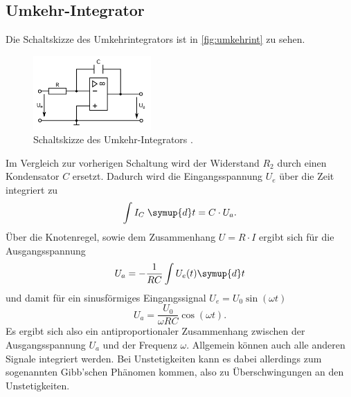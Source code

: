 \subsection{Umkehr-Integrator}
Die Schaltskizze des Umkehrintegrators ist in \autoref{fig:umkehrint} zu sehen.
\begin{figure}[H]
    \centering
    \includegraphics[width=0.4\textwidth]{integrator.png}
    \caption{Schaltskizze des Umkehr-Integrators \cite{anleitung}.}
    \label{fig:umkehrint}
\end{figure}
Im Vergleich zur vorherigen Schaltung wird der Widerstand $R_2$ durch einen Kondensator $C$
ersetzt.
Dadurch wird die Eingangsspannung $U_e$ über die Zeit integriert zu
\begin{equation*}
    \int I_C \; \symup{d} t = C \cdot U_a.
\end{equation*}
Über die Knotenregel, sowie dem Zusammenhang $U = R \cdot I$ ergibt sich für die Ausgangsspannung
\begin{equation*}
    U_a = - \frac{1}{RC} \int U_e (t) \symup{d} t
\end{equation*}
und damit für ein sinusförmiges Eingangssignal $U_e = U_0 \sin(\omega t)$
\begin{equation*}
    U_a = \frac{U_0}{\omega R C} \cos(\omega t).
\end{equation*}
Es ergibt sich also ein antiproportionaler Zusammenhang zwischen der Ausgangsspannung $U_a$
und der Frequenz $\omega$. Allgemein können auch alle anderen Signale integriert werden.
Bei Unstetigkeiten kann es dabei allerdings zum sogenannten Gibb'schen Phänomen kommen,
also zu Überschwingungen an den Unstetigkeiten. 

